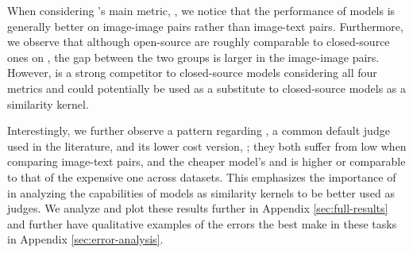 When considering \mmscore's main metric, \nmi, we notice that the performance of models is generally better on image-image pairs rather than image-text pairs. Furthermore, we observe that although open-source \modelss{} are roughly comparable to closed-source ones on \mmscorewuimgtext, the gap between the two groups is larger in the image-image pairs. However, \internvlTwoFiveEightB{} is a strong competitor to closed-source models considering all four metrics and could potentially be used as a substitute to closed-source models as a similarity kernel.

Interestingly, we further observe a pattern regarding \gptFouroEleven{}, a common default judge used in the literature, and its lower cost version, \gptFouroMini{}; they both suffer from low \relaxsymone{} when comparing image-text pairs, and the cheaper model's \control{} and \smoothness{} is higher or comparable to that of the expensive one across datasets. This emphasizes the importance of \mmscore{} in analyzing the capabilities of models as similarity kernels to be better used as judges. We analyze and plot these results further in Appendix \ref{sec:full-results} and further have qualitative examples of the errors the best \modelss{} make in these tasks in Appendix \ref{sec:error-analysis}.~




